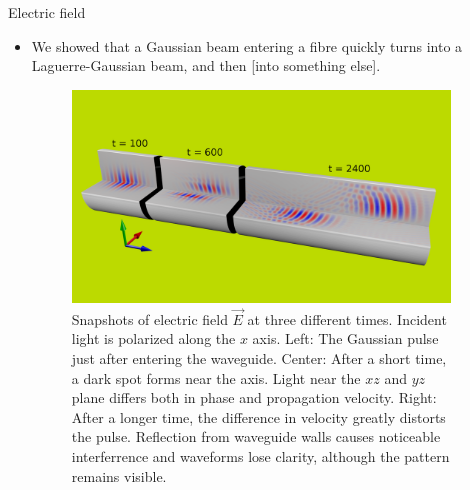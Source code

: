 \documentclass{beamer}
\newlength{\wideitemsep}
\let\olditem\item
\renewcommand{\item}{\setlength{\itemsep}{\wideitemsep}\olditem}
\newcommand{\blockpadding}{
  \rule[-0.6ex]{0pt}{2.5ex}
}
\begin{document}
\begin{columns}[t]
\begin{column}{.36\textwidth}
 \end{column}
 
 \begin{column}{0.596\textwidth}
  \begin{block}{\blockpadding Electric field}
  \begin{itemize}
   \item We showed that a Gaussian beam entering a fibre quickly turns into a Laguerre-Gaussian beam, and then [into something else]. 
\begin{figure}[h]
\centering
 \includegraphics[width=.825\textwidth,clip,trim=0mm 50mm 0mm 80mm]{./render_t}
 \caption{Snapshots of electric field $\vec E$ at three different times. Incident light is polarized along the $x$ axis. {\color{dark} Left:} The Gaussian pulse just after entering the waveguide. {\color{dark} Center:} After a short time, a dark spot forms near the axis. Light near the $xz$ and $yz$ plane differs both in phase and propagation velocity. {\color{dark} Right:} After a longer time, the difference in velocity greatly distorts the pulse. Reflection from waveguide walls causes noticeable interferrence and waveforms lose clarity, although the pattern remains visible. }
\end{figure}
\end{itemize}


\end{block}
\end{column}
\end{columns}
\end{document}
